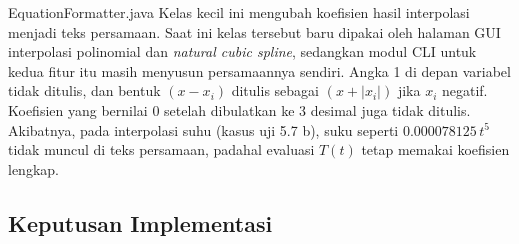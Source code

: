 \begin{kelas}{EquationFormatter.java}
Kelas kecil ini mengubah koefisien hasil interpolasi menjadi teks persamaan. Saat ini kelas tersebut baru dipakai oleh halaman GUI interpolasi polinomial dan \textit{natural cubic spline}, sedangkan modul CLI untuk kedua fitur itu masih menyusun persamaannya sendiri. Angka 1 di depan variabel tidak ditulis, dan bentuk $(x - x_i)$ ditulis sebagai $(x + |x_i|)$ jika $x_i$ negatif. Koefisien yang bernilai 0 setelah dibulatkan ke 3 desimal juga tidak ditulis. Akibatnya, pada interpolasi suhu (kasus uji 5.7 b), suku seperti $0.000078125\,t^5$ tidak muncul di teks persamaan, padahal evaluasi $T(t)$ tetap memakai koefisien lengkap.
 
 
\end{kelas}

\subsection{Keputusan Implementasi}

